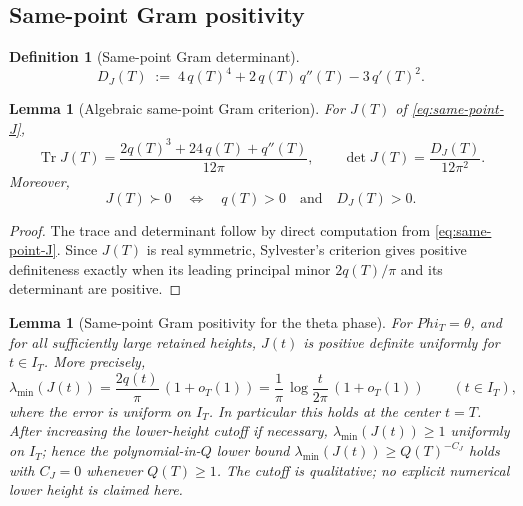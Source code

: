 \documentclass[11pt,a4paper]{amsart}
\def\Phi{Phi}%
\numberwithin{equation}{section}
\theoremstyle{plain}
\newtheorem{lemma}[theorem]{Lemma}
\theoremstyle{definition}
\newtheorem{definition}[theorem]{Definition}
\newcommand{\Ph}{\Phi}
\newcommand{\Tr}{\operatorname{Tr}}
\begin{document}
\subsection{Same-point Gram positivity}
\label{subsec:same-point-gram-positivity}

\begin{definition}[Same-point Gram determinant]
\label{def:same-point-gram-determinant}
\begin{equation}
\label{eq:same-point-gram-determinant}
D_J(T) \;:=\; 4\,q(T)^4 + 2\,q(T)\,q''(T) - 3\,q'(T)^2.
\end{equation}
\end{definition}

\begin{lemma}[Algebraic same-point Gram criterion]
\label{lem:algebraic-same-point-gram-criterion}
For \(J(T)\) of \eqref{eq:same-point-J},
\begin{equation}
\label{eq:J-trace-det}
\Tr J(T) = \frac{2 q(T)^3 + 24\,q(T) + q''(T)}{12\pi},\qquad
\det J(T) = \frac{D_J(T)}{12\pi^2}.
\end{equation}
Moreover,
\[
        J(T)\succ 0
        \quad\Longleftrightarrow\quad
        q(T) > 0 \quad\text{and}\quad D_J(T) > 0.
\]
\end{lemma}

\begin{proof}
The trace and determinant follow by direct computation from
\eqref{eq:same-point-J}.  Since \(J(T)\) is real symmetric,
Sylvester's criterion gives positive definiteness exactly when its
leading principal minor \(2q(T)/\pi\) and its determinant are
positive.
\end{proof}

\begin{lemma}[Same-point Gram positivity for the theta phase]
\label{lem:same-point-gram-positivity}
For \(\Ph_T = \theta\), and for all sufficiently large retained
heights, \(J(t)\) is positive definite uniformly for \(t\in I_T\).
More precisely,
\begin{equation}
\label{eq:lambda-min-asymptotic}
        \lambda_{\min}(J(t))
        = \frac{2 q(t)}{\pi}\,(1 + o_T(1))
        = \frac{1}{\pi}\,\log\frac{t}{2\pi}\,(1 + o_T(1))
        \qquad(t\in I_T),
\end{equation}
where the error is uniform on \(I_T\).  In particular this holds at the
center \(t=T\).  After increasing the lower-height cutoff if necessary,
\(\lambda_{\min}(J(t)) \ge 1\) uniformly on \(I_T\); hence the
polynomial-in-\(Q\) lower bound
\(\lambda_{\min}(J(t)) \ge Q(T)^{-C_J}\) holds with \(C_J = 0\)
whenever \(Q(T) \ge 1\).  The cutoff is qualitative; no explicit
numerical lower height is claimed here.
\end{lemma}
\end{document}
